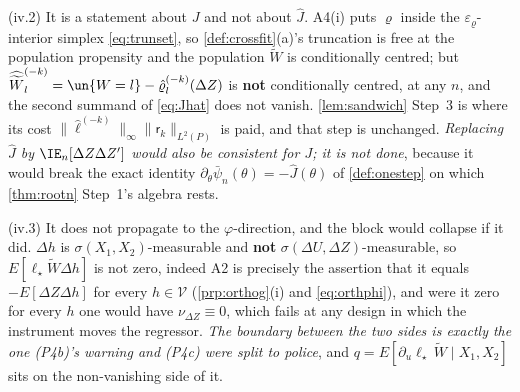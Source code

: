 \begin{lemma}[{The moment is valid, its variance is finite, its $\theta$-Jacobian is $-J$, and $J=E[\Delta Z\Delta Z']$}]
\textup{(iv.2)} It is a statement about $J$ and not about $\hat J$. A4(i) puts $\varrho$ inside
the $\varepsilon_\varrho$-interior simplex \eqref{eq:trunset}, so \cref{def:crossfit}(a)'s truncation is free at the
population propensity and the population $\widetilde W$ is conditionally centred; but
$\widehat{\widetilde W}^{(-k)}_l=\un\{W=l\}-\hat\varrho^{(-k)}_l(\Delta Z)$ is \textbf{not} conditionally centred, at
any $n$, and the second summand of \eqref{eq:Jhat} does not vanish. \cref{lem:sandwich} Step~3 is where its
cost $\|\hat\ell^{(-k)}\|_\infty\|\mathsf r_k\|_{L^{2}(P)}$ is paid, and that step is unchanged.
\emph{Replacing $\hat J$ by $\IE_n[\Delta Z\Delta Z']$ would also be consistent for $J$; it is not
done}, because it would break the exact identity $\partial_\theta\bar\psi_n(\theta)=-\hat J(\theta)$ of
\cref{def:onestep} on which \cref{thm:rootn} Step~1's algebra rests.

\textup{(iv.3)} It does not propagate to the $\varphi$-direction, and the block would collapse if it
did. $\Delta h$ is $\sigma(X_1,X_2)$-measurable and \textbf{not}
$\sigma(\Delta U,\Delta Z)$-measurable, so $E[\ell_\star\widetilde W\Delta h]$ is not zero, indeed A2 is
precisely the assertion that it equals $-E[\Delta Z\Delta h]$ for every $h\in\mathcal V$
(\cref{prp:orthog}\textup{(i)} and \eqref{eq:orthphi}), and were it zero for every $h$ one would have
$\nu_{\Delta Z}\equiv0$, which fails at any design in which the instrument moves the regressor.
\emph{The boundary between the two sides is exactly the one \textup{(P4b)}'s warning and \textup{(P4c)}
were split to police}, and $q=E[\partial_u\ell_\star\,\widetilde W\mid X_1,X_2]$ sits on the non-vanishing
side of it.


\end{lemma}
